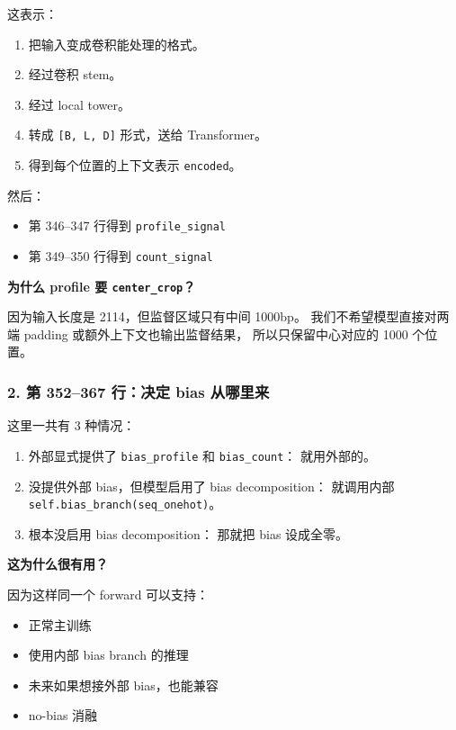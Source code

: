 \documentclass[11pt,a4paper]{ctexart}
\begin{document}
这表示：

\begin{enumerate}[leftmargin=2em]
\item 把输入变成卷积能处理的格式。
\item 经过卷积 stem。
\item 经过 local tower。
\item 转成 \texttt{[B, L, D]} 形式，送给 Transformer。
\item 得到每个位置的上下文表示 \texttt{encoded}。
\end{enumerate}

然后：

\begin{itemize}[leftmargin=2em]
\item 第 346--347 行得到 \texttt{profile\_signal}
\item 第 349--350 行得到 \texttt{count\_signal}
\end{itemize}

\textbf{为什么 profile 要 \texttt{center\_crop}？}

因为输入长度是 2114，但监督区域只有中间 1000bp。
我们不希望模型直接对两端 padding 或额外上下文也输出监督结果，
所以只保留中心对应的 1000 个位置。

\subsubsection*{2. 第 352--367 行：决定 bias 从哪里来}

这里一共有 3 种情况：

\begin{enumerate}[leftmargin=2em]
\item 外部显式提供了 \texttt{bias\_profile} 和 \texttt{bias\_count}：
  就用外部的。
\item 没提供外部 bias，但模型启用了 bias decomposition：
  就调用内部 \texttt{self.bias\_branch(seq\_onehot)}。
\item 根本没启用 bias decomposition：
  那就把 bias 设成全零。
\end{enumerate}

\textbf{这为什么很有用？}

因为这样同一个 forward 可以支持：

\begin{itemize}[leftmargin=2em]
\item 正常主训练
\item 使用内部 bias branch 的推理
\item 未来如果想接外部 bias，也能兼容
\item no-bias 消融
\end{itemize}
\end{document}
